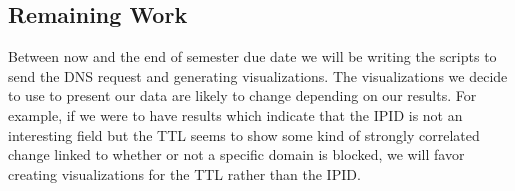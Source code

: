 \documentclass[format=acmsmall, screen=true]{acmart}
\begin{document}
\subsection{Remaining Work}

Between now and the end of semester due date we will be writing the scripts to send the DNS request and generating visualizations. The visualizations we decide to use to present our data are likely to change depending on our results. For example, if we were to have results which indicate that the IPID is not an interesting field but the TTL seems to show some kind of strongly correlated change linked to whether or not a specific domain is blocked, we will favor creating visualizations for the TTL rather than the IPID.







\end{document}
